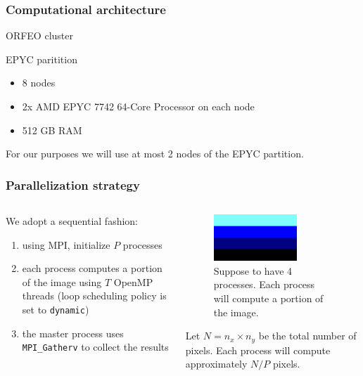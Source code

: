 \documentclass{beamer}
\begin{document}
\begin{frame}
    \frametitle{Computational architecture}
    ORFEO cluster

    EPYC paritition

    \begin{itemize}
        \item 8 nodes
        \item 2x AMD EPYC 7742 64-Core Processor on each node
        \item 512 GB RAM
    \end{itemize}

    For our purposes we will use at most 2 nodes of the EPYC partition.
\end{frame}


\begin{frame}
    \frametitle{Parallelization strategy}
 
    \begin{columns}

        \begin{column}{0.5\textwidth}
            We adopt a sequential fashion:
            \begin{enumerate}
                \item using MPI, initialize $P$ processes 
                \item each process computes a portion of the image using $T$ OpenMP threads (loop scheduling policy is set to \texttt{dynamic})
                \item the master process uses \texttt{MPI\_Gatherv} to collect the results
            \end{enumerate}
        \end{column}

        \begin{column}{0.5\textwidth}
            \begin{figure}
                \centering
                \includegraphics[width=0.7\textwidth]{../images/process_subdivision.png}
                \caption{Suppose to have 4 processes. Each process will compute a portion of the image.}
            \end{figure}
            Let $N = n_x \times n_y$ be the total number of pixels.
            Each process will compute approximately $N/P$ pixels.
        \end{column}

    \end{columns}

\end{frame}
\end{document}
